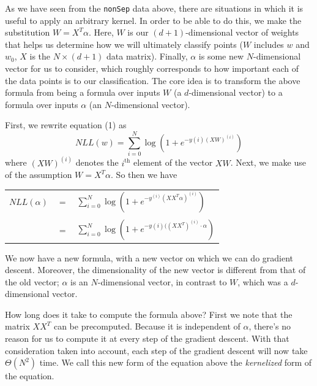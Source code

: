 \documentclass{sigchi}
\begin{document}
As we have seen from the \texttt{nonSep} data above, there are situations in which it is useful to apply an arbitrary kernel. In order to be able to do this, we make the substitution $W = X^T \alpha$. Here, $W$ is our $(d+1)$-dimensional vector of weights that helps us determine how we will ultimately classify points ($W$ includes $w$ and $w_0$, $X$ is the $N \times (d+1)$ data matrix). Finally, $\alpha$ is some new $N$-dimensional vector for us to consider, which roughly corresponds to how important each of the data points is to our classification. The core idea is to transform the above formula from being a formula over inputs $W$ (a $d$-dimensional vector) to a formula over inputs $\alpha$ (an $N$-dimensional vector). 

First, we rewrite equation (1) as
$$NLL(w) = \sum_{i=0}^N \log(1+e^{-y{(i)}(XW)^{(i)}})$$
where $(XW)^{(i)}$ denotes the $i^{\textrm{th}}$ element of the vector $XW$. Next, we make use of the assumption $W = X^T\alpha$. So then we have

\begin{center}
\begin{tabular}{r c l}
$NLL(\alpha)$&$=$&$\displaystyle \sum_{i=0}^N \log(1+e^{-y^{(i)}(XX^T\alpha)^{(i)}})$\\
&&\\
&$=$&$\displaystyle \sum_{i=0}^N \log(1+e^{-y{(i)}((XX^T)^{(i)} \cdot \alpha})$
\end{tabular}
\end{center}

We now have a new formula, with a new vector on which we can do gradient descent. Moreover, the dimensionality of the new vector is different from that of the old vector; $\alpha$ is an $N$-dimensional vector, in contrast to $W$, which was a $d$-dimensional vector. 

How long does it take to compute the formula above? %
First we note that the matrix $XX^T$ can be precomputed. Because it is independent of $\alpha$, there's no reason for us to compute it at every step of the gradient descent. With that consideration taken into account, each step of the gradient descent will now take $\Theta(N^2)$ time. We call this new form of the equation above the \emph{kernelized} form of the equation.%
\end{document}
